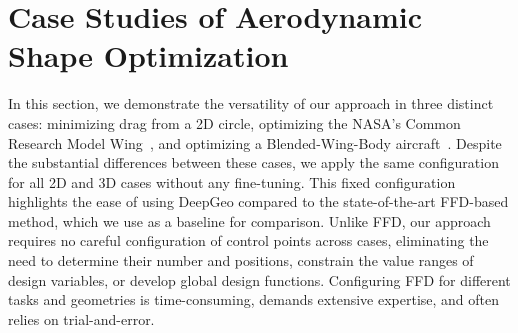 \section{Case Studies of Aerodynamic Shape Optimization}
\label{ch5:sec:cases}

In this section, we demonstrate the versatility of our approach in three distinct cases: minimizing drag from a 2D circle, optimizing the NASA's Common Research Model Wing~\cite{aa.Vassberg2008}, and optimizing a Blended-Wing-Body aircraft~\cite{aa.Liebeck2004}. Despite the substantial differences between these cases, we apply the same configuration for all 2D and 3D cases without any fine-tuning. This fixed configuration highlights the ease of using DeepGeo compared to the state-of-the-art FFD-based method, which we use as a baseline for comparison. Unlike FFD, our approach requires no careful configuration of control points across cases, eliminating the need to determine their number and positions, constrain the value ranges of design variables, or develop global design functions. Configuring FFD for different tasks and geometries is time-consuming, demands extensive expertise, and often relies on trial-and-error.